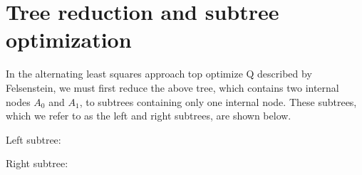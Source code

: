 \documentclass{article} %
\begin{document}
\section{Tree reduction and subtree optimization}
In the alternating least squares approach top optimize Q described by Felsenstein, we must first reduce the above tree, which contains two internal nodes $A_0$ and $A_1$, to subtrees containing only one internal node. These subtrees, which we refer to as the left and right subtrees, are shown below.

Left subtree:
\begin{center}
\end{center}

Right subtree:
\begin{center}
\end{center}
\end{document}
